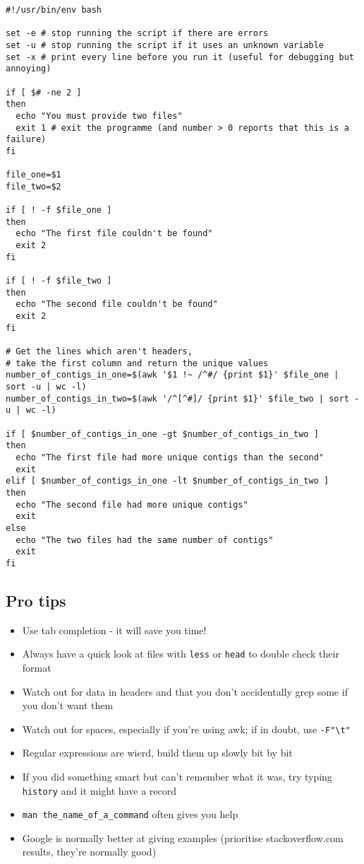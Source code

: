 \documentclass[11pt]{article}
\providecommand{\tightlist}{%
      \setlength{\itemsep}{0pt}\setlength{\parskip}{0pt}}
\begin{document}
\begin{verbatim}
#!/usr/bin/env bash

set -e # stop running the script if there are errors
set -u # stop running the script if it uses an unknown variable
set -x # print every line before you run it (useful for debugging but annoying)

if [ $# -ne 2 ]
then
  echo "You must provide two files"
  exit 1 # exit the programme (and number > 0 reports that this is a failure)
fi

file_one=$1
file_two=$2

if [ ! -f $file_one ]
then
  echo "The first file couldn't be found"
  exit 2
fi

if [ ! -f $file_two ]
then
  echo "The second file couldn't be found"
  exit 2
fi

# Get the lines which aren't headers,
# take the first column and return the unique values
number_of_contigs_in_one=$(awk '$1 !~ /^#/ {print $1}' $file_one | sort -u | wc -l)
number_of_contigs_in_two=$(awk '/^[^#]/ {print $1}' $file_two | sort -u | wc -l)

if [ $number_of_contigs_in_one -gt $number_of_contigs_in_two ]
then
  echo "The first file had more unique contigs than the second"
  exit
elif [ $number_of_contigs_in_one -lt $number_of_contigs_in_two ]
then
  echo "The second file had more unique contigs"
  exit
else
  echo "The two files had the same number of contigs"
  exit
fi
\end{verbatim}

\hypertarget{pro-tips}{%
\subsection{Pro tips}\label{pro-tips}}

\begin{itemize}
\tightlist
\item
  Use tab completion - it will save you time!
\item
  Always have a quick look at files with \texttt{less} or \texttt{head}
  to double check their format
\item
  Watch out for data in headers and that you don't accidentally grep
  some if you don't want them
\item
  Watch out for spaces, especially if you're using awk; if in doubt, use
  \texttt{-F"\textbackslash{}t"}
\item
  Regular expressions are wierd, build them up slowly bit by bit
\item
  If you did something smart but can't remember what it was, try typing
  \texttt{history} and it might have a record
\item
  \texttt{man\ the\_name\_of\_a\_command} often gives you help
\item
  Google is normally better at giving examples (prioritise
  stackoverflow.com results, they're normally good)
\end{itemize}
\end{document}
